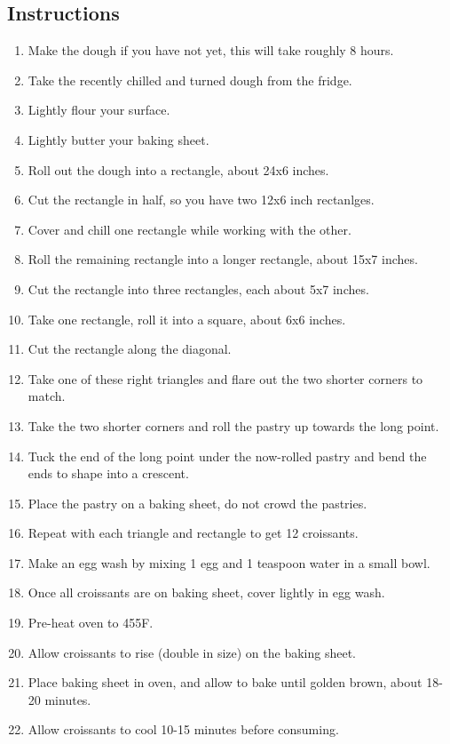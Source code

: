 \begin{multicols}{2}
\subsection*{Instructions}
\begin{enumerate}
    \item Make the  dough if you have not yet, this will take roughly 8 hours.
    \item Take the recently chilled and turned dough from the fridge.
    \item Lightly flour your surface.
    \item Lightly butter your baking sheet.
    \item Roll out the dough into a rectangle, about 24x6 inches.
    \item Cut the rectangle in half, so you have two 12x6 inch rectanlges.
    \item Cover and chill one rectangle while working with the other.
    \item Roll the remaining rectangle into a longer rectangle, about 15x7 inches.
    \item Cut the rectangle into three rectangles, each about 5x7 inches.
    \item Take one rectangle, roll it into a square, about 6x6 inches.
    \item Cut the rectangle along the diagonal.
    \item Take one of these right triangles and flare out the two shorter corners to match.
    \item Take the two shorter corners and roll the pastry up towards the long point.
    \item Tuck the end of the long point under the now-rolled pastry and bend the ends to shape into a crescent.
    \item Place the pastry on a baking sheet, do not crowd the pastries.
    \item Repeat with each triangle and rectangle to get 12 croissants.
    \item Make an egg wash by mixing 1 egg and 1 teaspoon water in a small bowl.
    \item Once all croissants are on baking sheet, cover lightly in egg wash.
    \item Pre-heat oven to 455F.
    \item Allow croissants to rise (double in size) on the baking sheet.
    \item Place baking sheet in oven, and allow to bake until golden brown, about 18-20 minutes.
    \item Allow croissants to cool 10-15 minutes before consuming.
    

\end{enumerate}
\end{multicols}
